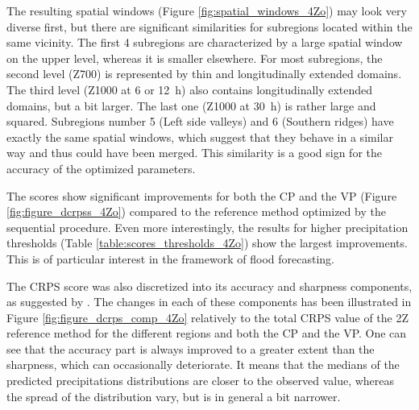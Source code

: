\documentclass[review]{elsarticle}
\begin{document}
The resulting spatial windows (Figure \ref{fig:spatial_windows_4Zo}) may look very diverse first, but there are significant similarities for subregions located within the same vicinity. The first 4 subregions are characterized by a large spatial window on the upper level, whereas it is smaller elsewhere. For most subregions, the second level (Z700) is represented by thin and longitudinally extended domains. The third level (Z1000 at 6 or 12~h) also contains longitudinally extended domains, but a bit larger. The last one (Z1000 at 30~h) is rather large and squared. Subregions number 5 (Left side valleys) and 6 (Southern ridges) have exactly the same spatial windows, which suggest that they behave in a similar way and thus could have been merged. This similarity is a good sign for the accuracy of the optimized parameters.

The scores show significant improvements for both the CP and the VP (Figure \ref{fig:figure_dcrpss_4Zo}) compared to the reference method optimized by the sequential procedure. Even more interestingly, the results for higher precipitation thresholds (Table \ref{table:scores_thresholds_4Zo}) show the largest improvements. This is of particular interest in the framework of flood forecasting.

The CRPS score was also discretized into its accuracy and sharpness components, as suggested by \citet{Bontron2004}. The changes in each of these components has been illustrated in Figure \ref{fig:figure_dcrps_comp_4Zo} relatively to the total CRPS value of the 2Z reference method for the different regions and both the CP and the VP. One can see that the accuracy part is always improved to a greater extent than the sharpness, which can occasionally deteriorate. It means that the medians of the predicted precipitations distributions are closer to the observed value, whereas the spread of the distribution vary, but is in general a bit narrower.
\end{document}
